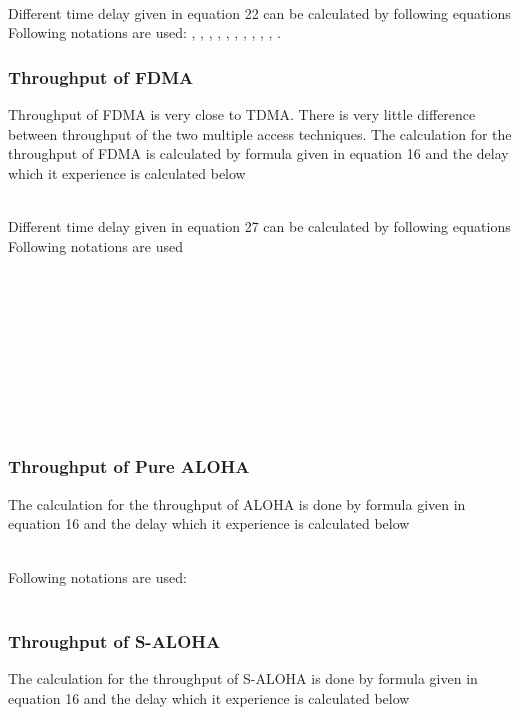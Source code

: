 \documentclass[10pt, conference, compsocconf]{IEEEtran}
\begin{document}
\\
Different time delay given in equation 22 can be calculated by following equations
\\


Following notations are used:  ,        ,  ,  ,  ,  ,   ,   ,   ,   ,   .
\subsubsection{Throughput of FDMA}
Throughput of FDMA is very close to TDMA. There is very little difference between throughput of the two multiple access techniques. The calculation for the throughput of FDMA is calculated by formula given in equation 16 and the delay which it experience is calculated below

\\
Different time delay given in equation 27 can be calculated by following equations
\\


Following notations are used
\\
       
\\
 
\\
 
\\
 
\\
 
\\
  
\\
  
\\
  
\\
  
\\
\subsubsection{Throughput of Pure ALOHA}
The calculation for the throughput of ALOHA is done by formula given in equation 16 and the delay which it experience is calculated below

\\
Following notations are used:        
\\
  
\\
\subsubsection{Throughput of S-ALOHA}
The calculation for the throughput of S-ALOHA is done by formula given in equation 16 and the delay which it experience is calculated below
\end{document}
